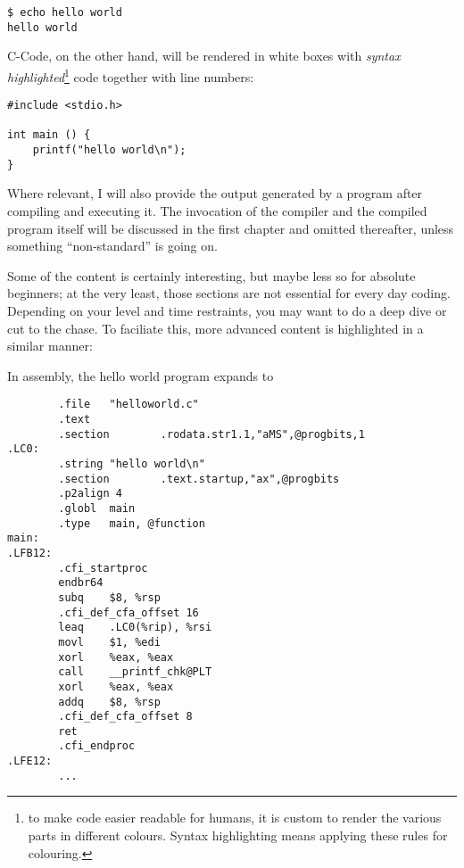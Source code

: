 \begin{cmdbox}
\texttt{\$ echo hello world} \\
\texttt{hello world}
\end{cmdbox}

C-Code, on the other hand, will be rendered in white boxes with \emph{syntax highlighted}\footnote{to make code easier readable for humans, it is custom to render the various parts in different colours. Syntax highlighting means applying these rules for colouring.} code together with line numbers:
\begin{codebox}[C-Code]
\begin{verbatim}
#include <stdio.h>

int main () {
    printf("hello world\n");
}
\end{verbatim}
\end{codebox}

Where relevant, I will also provide the output generated by a program after compiling and executing it. The invocation of the compiler and the compiled program itself will be discussed in the first chapter and omitted thereafter, unless something \enquote{non-standard} is going on.

Some of the content is certainly interesting, but maybe less so for absolute beginners; at the very least, those sections are not essential for every day coding. Depending on your level and time restraints, you may want to do a deep dive or cut to the chase. To faciliate this, more advanced content is highlighted in a similar manner:
\begin{plusbox}
In assembly, the hello world program expands to
\begin{codebox}
\begin{verbatim}
        .file   "helloworld.c"
        .text
        .section        .rodata.str1.1,"aMS",@progbits,1
.LC0:
        .string "hello world\n"
        .section        .text.startup,"ax",@progbits
        .p2align 4
        .globl  main
        .type   main, @function
main:
.LFB12:
        .cfi_startproc
        endbr64
        subq    $8, %rsp
        .cfi_def_cfa_offset 16
        leaq    .LC0(%rip), %rsi
        movl    $1, %edi
        xorl    %eax, %eax
        call    __printf_chk@PLT
        xorl    %eax, %eax
        addq    $8, %rsp
        .cfi_def_cfa_offset 8
        ret
        .cfi_endproc
.LFE12:
        ...
\end{verbatim}
\end{codebox}
\end{plusbox}

